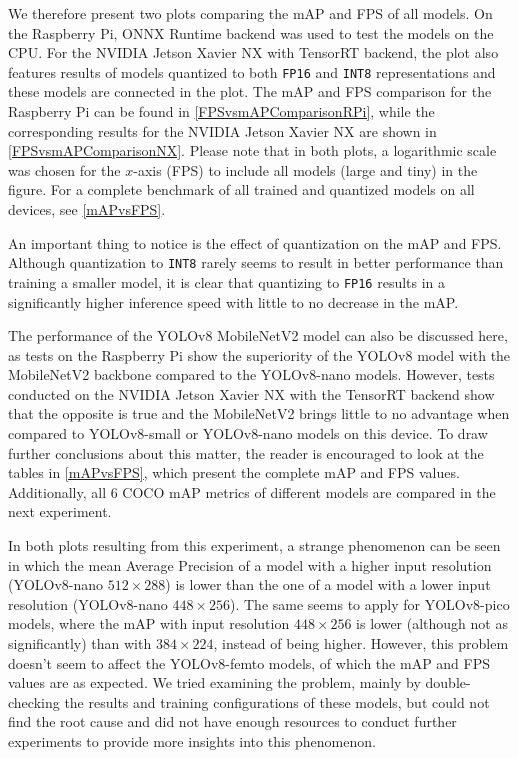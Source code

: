 We therefore present two plots comparing the mAP and FPS of all models. On the
Raspberry Pi, ONNX Runtime backend was used to test the models on the CPU. For
the NVIDIA Jetson Xavier NX with TensorRT backend, the plot also features
results of models quantized to both \texttt{FP16} and \texttt{INT8}
representations and these models are connected in the plot. The mAP and FPS
comparison for the Raspberry Pi can be found in \autoref{FPSvsmAPComparisonRPi},
while the corresponding results for the NVIDIA Jetson Xavier NX are shown in
\autoref{FPSvsmAPComparisonNX}. Please note that in both plots, a logarithmic
scale was chosen for the $x$-axis (FPS) to include all models (large and tiny) in
the figure. For a complete benchmark of all trained and quantized models on all
devices, see \autoref{mAPvsFPS}.

An important thing to notice is the effect of quantization on the mAP and FPS.
Although quantization to \texttt{INT8} rarely seems to result in better
performance than training a smaller model, it is clear that quantizing to
\texttt{FP16} results in a significantly higher inference speed with little to
no decrease in the mAP.

The performance of the YOLOv8 MobileNetV2 model can also be discussed here, as
tests on the Raspberry Pi show the superiority of the YOLOv8 model with the
MobileNetV2 backbone compared to the YOLOv8-nano models. However, tests
conducted on the NVIDIA Jetson Xavier NX with the TensorRT backend show that the
opposite is true and the MobileNetV2 brings little to no advantage when compared
to YOLOv8-small or YOLOv8-nano models on this device. To draw further
conclusions about this matter, the reader is encouraged to look at the tables in
\autoref{mAPvsFPS}, which present the complete mAP and FPS values. Additionally,
all 6 COCO mAP metrics of different models are compared in the next experiment.

In both plots resulting from this experiment, a strange phenomenon can be seen
in which the mean Average Precision of a model with a higher input
resolution (YOLOv8-nano $512 \times 288$) is lower than the one of a model
with a lower input resolution (YOLOv8-nano $448 \times 256$). The same seems to apply for
YOLOv8-pico models, where the mAP with input resolution $448 \times 256$ is
lower (although not as significantly) than with $384 \times 224$, instead of
being higher. However, this problem doesn't seem to affect the YOLOv8-femto
models, of which the mAP and FPS values are as expected. We tried examining the
problem, mainly by double-checking the results and training configurations of
these models, but could not find the root cause and did not have enough
resources to conduct further experiments to provide more insights into this
phenomenon.

